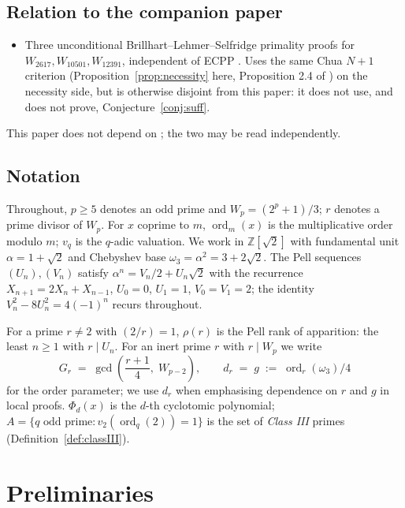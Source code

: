 \documentclass[11pt]{amsart}
\theoremstyle{plain}
\theoremstyle{definition}
\theoremstyle{remark}
\numberwithin{equation}{section}
\newcommand{\ord}{\operatorname{ord}}
\newcommand{\Z}{\mathbb{Z}}
\begin{document}
\subsection{Relation to the companion paper}

\begin{itemize}
\item \textbf{\cite{ref:A}} Three unconditional Brillhart--Lehmer--Selfridge \cite{ref:BLS} primality proofs for $W_{2617}, W_{10501}, W_{12391}$, independent of ECPP \cite{ref:AtkinMorain}. Uses the same Chua $N + 1$ criterion (Proposition~\ref{prop:necessity} here, Proposition 2.4 of \cite{ref:A}) on the necessity side, but is otherwise disjoint from this paper: it does not use, and does not prove, Conjecture~\ref{conj:suff}.
\end{itemize}

This paper does not depend on \cite{ref:A}; the two may be read independently.

\subsection{Notation}\label{sec:notation}

Throughout, $p \geq 5$ denotes an odd prime and $W_p = (2^p + 1)/3$; $r$ denotes a prime divisor of $W_p$. For $x$ coprime to $m$, $\ord_m(x)$ is the multiplicative order modulo $m$; $v_q$ is the $q$-adic valuation. We work in $\Z[\sqrt 2]$ with fundamental unit $\alpha = 1 + \sqrt 2$ and Chebyshev base $\omega_3 = \alpha^2 = 3 + 2\sqrt 2$. The Pell sequences $(U_n), (V_n)$ satisfy $\alpha^n = V_n/2 + U_n \sqrt 2$ with the recurrence $X_{n+1} = 2 X_n + X_{n-1}$, $U_0 = 0$, $U_1 = 1$, $V_0 = V_1 = 2$; the identity $V_n^2 - 8 U_n^2 = 4(-1)^n$ recurs throughout.

For a prime $r \neq 2$ with $(2/r) = 1$, $\rho(r)$ is the Pell rank of apparition: the least $n \geq 1$ with $r \mid U_n$. For an inert prime $r$ with $r \mid W_p$ we write
\[
  G_r \;=\; \gcd\!\left(\frac{r+1}{4},\; W_{p-2}\right), \qquad d_r \;=\; g \;:=\; \ord_r(\omega_3)/4
\]
for the order parameter; we use $d_r$ when emphasising dependence on $r$ and $g$ in local proofs. $\Phi_d(x)$ is the $d$-th cyclotomic polynomial; $A = \{q \text{ odd prime} : v_2(\ord_q(2)) = 1\}$ is the set of \emph{Class III} primes (Definition~\ref{def:classIII}).

\section{Preliminaries}
\end{document}
